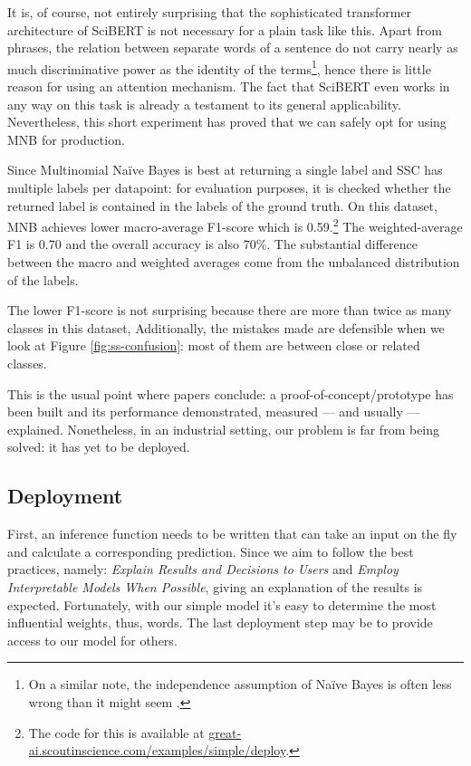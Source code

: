 It is, of course, not entirely surprising that the sophisticated transformer architecture of SciBERT is not necessary for a plain task like this. Apart from phrases, the relation between separate words of a sentence do not carry nearly as much discriminative power as the identity of the terms\footnote{On a similar note, the independence assumption of Naïve Bayes is often less wrong than it might seem \cite{hand2001idiot}.}, hence there is little reason for using an attention mechanism. The fact that SciBERT even works in any way on this task is already a testament to its general applicability. Nevertheless, this short experiment has proved that we can safely opt for using MNB for production.

Since Multinomial Naïve Bayes is best at returning a single label and SSC has multiple labels per datapoint: for evaluation purposes, it is checked whether the returned label is contained in the labels of the ground truth. On this dataset, MNB achieves lower macro-average F1-score which is 0.59.\footnote{The code for this is available at \href{https://great-ai.scoutinscience.com/examples/simple/deploy}{great-ai.scoutinscience.com/examples/simple/deploy}.} The weighted-average F1 is 0.70 and the overall accuracy is also 70\%. The substantial difference between the macro and weighted averages come from the unbalanced distribution of the labels.

The lower F1-score is not surprising because there are more than twice as many classes in this dataset,  Additionally, the mistakes made are defensible when we look at Figure \ref{fig:ss-confusion}: most of them are between close or related classes.

\begin{displayquote}
This is the usual point where papers conclude: a proof-of-concept/prototype has been built and its performance demonstrated, measured --- and usually --- explained. Nonetheless, in an industrial setting, our problem is far from being solved: it has yet to be deployed.
\end{displayquote}

\subsection{Deployment}

First, an inference function needs to be written that can take an input on the fly and calculate a corresponding prediction. Since we aim to follow the best practices, namely: \textit{Explain Results and Decisions to Users} and \textit{Employ Interpretable Models When Possible}, giving an explanation of the results is expected. Fortunately, with our simple model it's easy to determine the most influential weights, thus, words. The last deployment step may be to provide access to our model for others.

